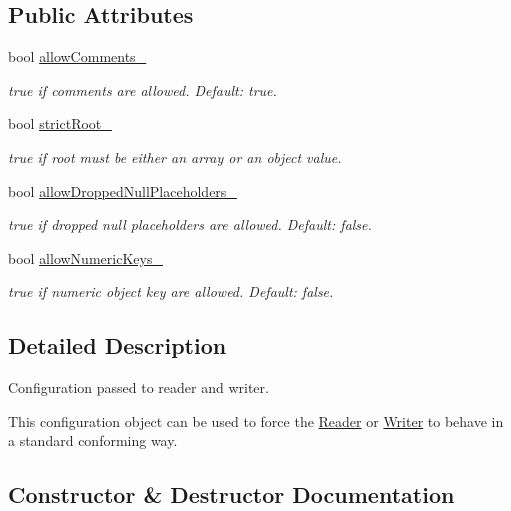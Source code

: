 \subsection*{Public Attributes}
\begin{DoxyCompactItemize}
\item 
bool \hyperlink{classJson_1_1Features_a33afd389719624b6bdb23950b3c346c9}{allow\+Comments\+\_\+}
\begin{DoxyCompactList}\small\item\em {\ttfamily true} if comments are allowed. Default\+: {\ttfamily true}. \end{DoxyCompactList}\item 
bool \hyperlink{classJson_1_1Features_a1162c37a1458adc32582b585b552f9c3}{strict\+Root\+\_\+}
\begin{DoxyCompactList}\small\item\em {\ttfamily true} if root must be either an array or an object value. \end{DoxyCompactList}\item 
bool \hyperlink{classJson_1_1Features_a5076aa72c05c7596ac339ede36c97a6a}{allow\+Dropped\+Null\+Placeholders\+\_\+}
\begin{DoxyCompactList}\small\item\em {\ttfamily true} if dropped null placeholders are allowed. Default\+: {\ttfamily false}. \end{DoxyCompactList}\item 
bool \hyperlink{classJson_1_1Features_aff3cb16b79d15d3d761b11a0dd6d4d6b}{allow\+Numeric\+Keys\+\_\+}
\begin{DoxyCompactList}\small\item\em {\ttfamily true} if numeric object key are allowed. Default\+: {\ttfamily false}. \end{DoxyCompactList}\end{DoxyCompactItemize}


\subsection{Detailed Description}
Configuration passed to reader and writer. 

This configuration object can be used to force the \hyperlink{classJson_1_1Reader}{Reader} or \hyperlink{classJson_1_1Writer}{Writer} to behave in a standard conforming way. 

\subsection{Constructor \& Destructor Documentation}
